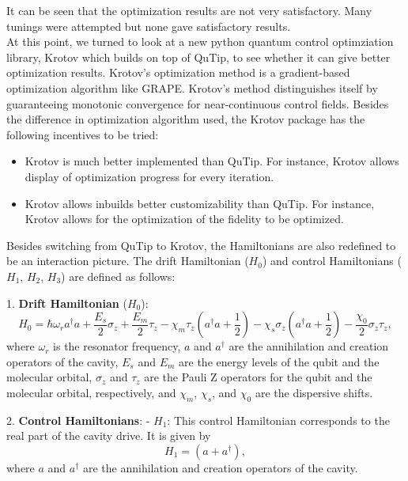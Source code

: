 \documentclass{article}
\begin{document}
It can be seen that the optimization results are not very satisfactory. 
Many tunings were attempted but none gave satisfactory results.
\\
At this point, we turned to look at a new python quantum control optimziation library, Krotov which builds on top of QuTip,
to see whether it can give better optimization results. Krotov’s optimization method is a gradient-based optimization algorithm like GRAPE. 
Krotov’s method distinguishes itself by guaranteeing monotonic convergence for near-continuous control fields. 
Besides the difference in optimization algorithm used, the Krotov package has the following incentives to be tried: 
\begin{itemize}
    \item Krotov is much better implemented than QuTip. For instance, Krotov allows display of optimization progress for every iteration. 
    \item Krotov allows inbuilds better customizability than QuTip. 
            For instance, Krotov allows for the optimization of the fidelity to be optimized.
\end{itemize}

Besides switching from QuTip to Krotov, the Hamiltonians are also redefined to be an interaction picture. 
The drift Hamiltonian ($H_0$) and control Hamiltonians ($H_1$, $H_2$, $H_3$) are defined as follows:

1. \textbf{Drift Hamiltonian} ($H_0$):
\begin{equation}
H_0 = \hbar \omega_r a^\dagger a + \frac{E_s}{2} \sigma_z + \frac{E_m}{2} \tau_z - \chi_m \tau_z \left(a^\dagger a + \frac{1}{2}\right) - \chi_s \sigma_z \left(a^\dagger a + \frac{1}{2}\right) - \frac{\chi_0}{2} \sigma_z \tau_z,
\end{equation}
where $\omega_r$ is the resonator frequency, $a$ and $a^\dagger$ are the annihilation and creation operators of the cavity, $E_s$ and $E_m$ are the energy levels of the qubit and the molecular orbital, $\sigma_z$ and $\tau_z$ are the Pauli Z operators for the qubit and the molecular orbital, respectively, and $\chi_m$, $\chi_s$, and $\chi_0$ are the dispersive shifts.

2. \textbf{Control Hamiltonians}:
   - $H_1$: This control Hamiltonian corresponds to the real part of the cavity drive. It is given by
     \begin{equation}
     H_1 = \left(a + a^\dagger\right),
     \end{equation}
     where $a$ and $a^\dagger$ are the annihilation and creation operators of the cavity.
\end{document}
